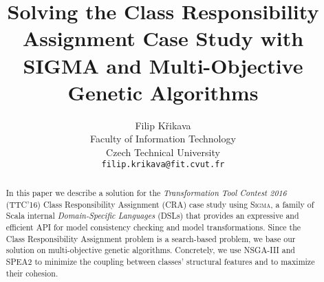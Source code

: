 \documentclass[a4paper]{article}
\title{Solving the \TTC Class Responsibility Assignment Case Study with SIGMA and Multi-Objective Genetic Algorithms}
\author{Filip Křikava\\ Faculty of Information Technology\\ Czech Technical University\\ \texttt{filip.krikava@fit.cvut.fr}}
\newcommand{\SIGMA}{\textsc{Sigma}\xspace}
\newcommand{\TTC}{TTC'16\xspace}
\begin{document}
\maketitle

\begin{abstract}
In this paper we describe a solution for the \emph{Transformation Tool Contest 2016} (\TTC) Class Responsibility Assignment (CRA) case study using \SIGMA, a family of Scala internal \emph{Domain-Specific Languages} (DSLs) that provides an expressive and efficient API for model consistency checking and model transformations.
Since the Class Responsibility Assignment problem is a search-based problem, we base our solution on multi-objective genetic algorithms.
Concretely, we use NSGA-III and SPEA2 to minimize the coupling between classes' structural features and to maximize their cohesion.
\end{abstract}









\appendix


\end{document}
